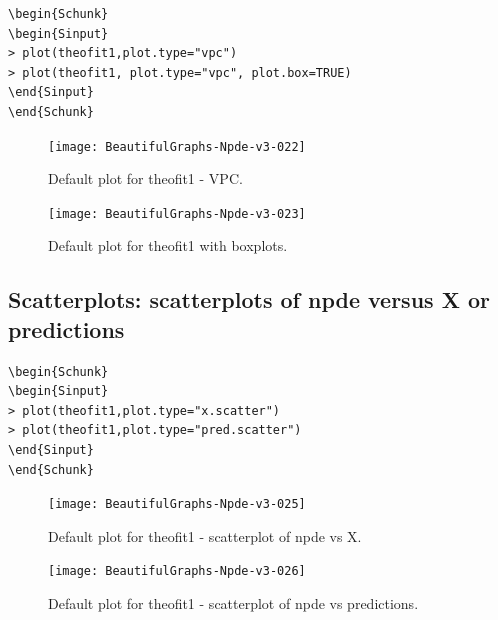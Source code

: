 \documentclass{report}
\begin{document}
\begin{lstlisting}[linerange=\\begin\{Sinput\}-\\end\{Sinput\}, includerangemarker=false]
\begin{Schunk}
\begin{Sinput}
> plot(theofit1,plot.type="vpc")
> plot(theofit1, plot.type="vpc", plot.box=TRUE)
\end{Sinput}
\end{Schunk}
\end{lstlisting}

\begin{figure}[H]
\caption{Default plot for theofit1 - VPC.}
\label{fig:plotByDefault}
\centering
\texttt{[image: BeautifulGraphs-Npde-v3-022]}
\end{figure}


\begin{figure}[H]
\caption{Default plot for theofit1 with boxplots.}
\label{fig:plotByDefault}
\centering
\texttt{[image: BeautifulGraphs-Npde-v3-023]}
\end{figure}

\subsection{Scatterplots: scatterplots of npde versus X or predictions}

\begin{lstlisting}[linerange=\\begin\{Sinput\}-\\end\{Sinput\}, includerangemarker=false]
\begin{Schunk}
\begin{Sinput}
> plot(theofit1,plot.type="x.scatter")
> plot(theofit1,plot.type="pred.scatter")
\end{Sinput}
\end{Schunk}
\end{lstlisting}

\begin{figure}[H]
\caption{Default plot for theofit1 - scatterplot of npde vs X.}
\label{fig:plotByDefault}
\centering
\texttt{[image: BeautifulGraphs-Npde-v3-025]}
\end{figure}

\begin{figure}[H]
\caption{Default plot for theofit1 - scatterplot of npde vs predictions.}
\label{fig:plotByDefault}
\centering
\texttt{[image: BeautifulGraphs-Npde-v3-026]}
\end{figure}
\end{document}
